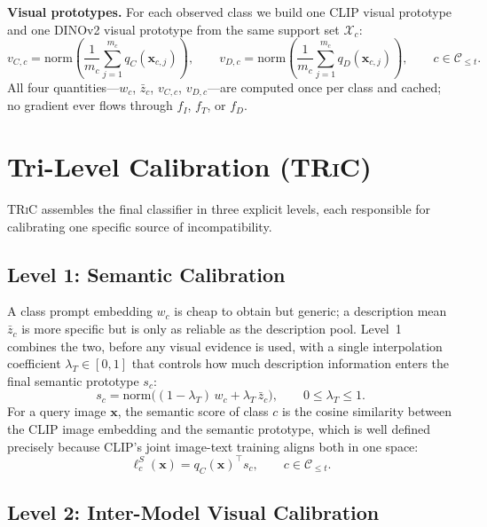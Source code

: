 \documentclass{iutbscthesis}
\begin{document}
\textbf{Visual prototypes.} For each observed class we build one CLIP visual prototype and one DINOv2 visual prototype from the same support set $\mathcal{X}_c$:
\begin{equation}
    v_{C,c} = \mathrm{norm}\!\left(\frac{1}{m_c}\sum_{j=1}^{m_c} q_C(\mathbf{x}_{c,j})\right), \qquad
    v_{D,c} = \mathrm{norm}\!\left(\frac{1}{m_c}\sum_{j=1}^{m_c} q_D(\mathbf{x}_{c,j})\right), \qquad c \in \mathcal{C}_{\le t}.
    \label{eq:visualprototypes}
\end{equation}
All four quantities---$w_c$, $\bar z_c$, $v_{C,c}$, $v_{D,c}$---are computed once per class and cached; no gradient ever flows through $f_I$, $f_T$, or $f_D$.

\section{Tri-Level Calibration (\textsc{TRiC})}
\label{sec:tric}

\textsc{TRiC} assembles the final classifier in three explicit levels, each responsible for calibrating one specific source of incompatibility.

\subsection{Level 1: Semantic Calibration}

A class prompt embedding $w_c$ is cheap to obtain but generic; a description mean $\bar z_c$ is more specific but is only as reliable as the description pool. Level~1 combines the two, before any visual evidence is used, with a single interpolation coefficient $\lambda_T \in [0,1]$ that controls how much description information enters the final semantic prototype $s_c$:
\begin{equation}
    s_c = \mathrm{norm}\big((1-\lambda_T)\, w_c + \lambda_T\, \bar z_c\big), \qquad 0 \le \lambda_T \le 1.
    \label{eq:level1}
\end{equation}
For a query image $\mathbf{x}$, the semantic score of class $c$ is the cosine similarity between the CLIP image embedding and the semantic prototype, which is well defined precisely because CLIP's joint image-text training aligns both in one space:
\begin{equation}
    \ell^S_c(\mathbf{x}) = q_C(\mathbf{x})^\top s_c, \qquad c \in \mathcal{C}_{\le t}.
    \label{eq:semanticscore}
\end{equation}

\subsection{Level 2: Inter-Model Visual Calibration}
\end{document}
